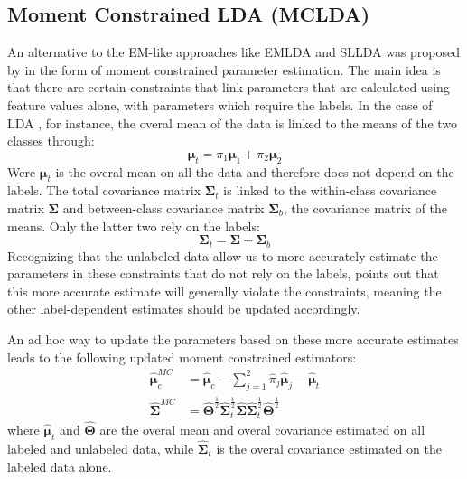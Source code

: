 \documentclass[10pt, a4paper, conference]{IEEEtran}
\begin{document}
\subsection{Moment Constrained LDA (MCLDA)}
An alternative to the EM-like approaches like EMLDA and SLLDA was proposed by \cite{Loog2010} in the form of moment constrained parameter estimation. The main idea is that there are certain constraints that link parameters that are calculated using feature values alone, with parameters which require the labels. In the case of LDA \cite{Loog2014a}, for instance, the overal mean of the data is linked to the means of the two classes through:
\begin{equation}
\label{eq:constraintmean}
\boldsymbol{\mu}_t=\pi_1 \boldsymbol{\mu}_1 + \pi_2 \boldsymbol{\mu}_2
\end{equation}
Were $\boldsymbol{\mu}_t$ is the overal mean on all the data and therefore does not depend on the labels.
The total covariance matrix $\mathbf{\Sigma}_t$ is linked to the within-class covariance matrix $\mathbf{\Sigma}$ and between-class covariance matrix $\mathbf{\Sigma}_b$, the covariance matrix of the means. Only the latter two rely on the labels:
\begin{equation}
\label{eq:constraintcovariance}
\mathbf{\Sigma}_t=\mathbf{\Sigma} + \mathbf{\Sigma}_b
\end{equation}
Recognizing that the unlabeled data allow us to more accurately estimate the parameters in these constraints that do not rely on the labels, \cite{Loog2014a} points out that this more accurate estimate will generally violate the constraints, meaning the other label-dependent estimates should be updated accordingly.

An ad hoc way to update the parameters based on these more accurate estimates \cite{Loog2014a} leads to the following updated moment constrained estimators:
\begin{align}
\hat{\boldsymbol{\mu}}_c^{MC} & =\hat{\boldsymbol{\mu}}_c - \sum_{j=1}^{2} \hat{\pi}_j \hat{\boldsymbol{\mu}}_j-\hat{\boldsymbol{\mu}}_t \\
\hat{\mathbf{\Sigma}}^{MC} &= \hat{\mathbf{\Theta}}^{\frac{1}{2}} \hat{\mathbf{\Sigma}}_t^{\frac{1}{2}} \hat{\mathbf{\Sigma}} \hat{\mathbf{\Sigma}}_t^{\frac{1}{2}} \hat{\mathbf{\Theta}}^{\frac{1}{2}}
\end{align}
where $\hat{\boldsymbol{\mu}}_t$ and $\hat{\mathbf{\Theta}}$ are the overal mean and overal covariance estimated on all labeled and unlabeled data, while $\hat{\mathbf{\Sigma}}_t$ is the overal covariance estimated on the labeled data alone.
\end{document}
